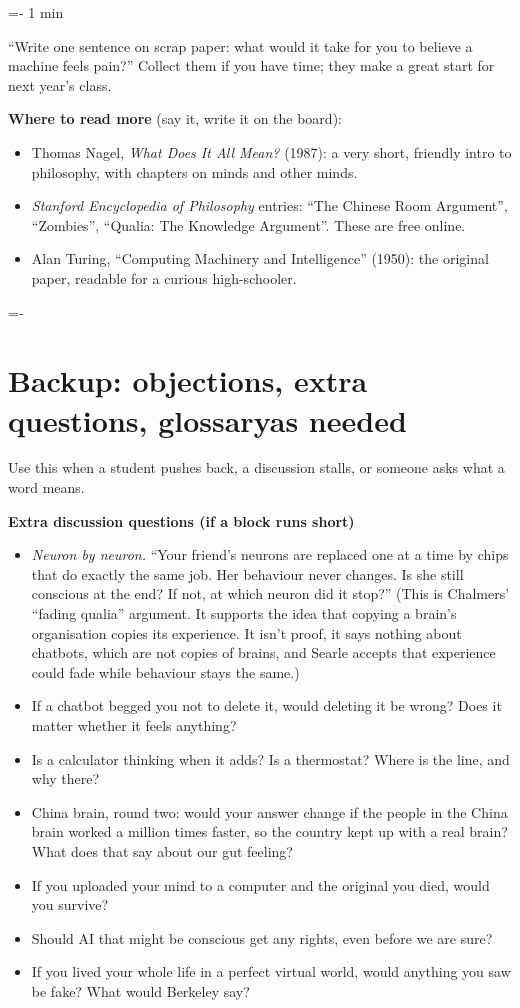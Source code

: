 \documentclass[11pt,letterpaper]{article}
\makeatletter
\newcommand{\keep}[1]{\par\penalty\z@\begingroup\dimen@=#1\relax\dimen@ii=\pagegoal\advance\dimen@ii-\pagetotal
  \ifdim\dimen@>\dimen@ii\ifdim\dimen@ii>\z@\vfil\break\fi\fi\endgroup}
\newcommand{\block}[2]{\keep{6\baselineskip}\section[#1]{#1\hfill{\normalsize\mdseries\color{muted}#2}}}
\newcommand{\beat}[2]{\keep{3\baselineskip}\vspace{5pt}\noindent{\sffamily\bfseries #1}\hfill{\sffamily\small\color{muted}#2}\par\nopagebreak\vspace{1pt}}
\makeatother
\begin{document}
\beat{Exit question}{1 min}
``Write one sentence on scrap paper: what would it take for you to believe a machine feels pain?'' Collect them if you have time; they make a great start for next year's class.

\textsf{\bfseries Where to read more} (say it, write it on the board):
\begin{itemize}
\item Thomas Nagel, \emph{What Does It All Mean?} (1987): a very short, friendly intro to philosophy, with chapters on minds and other minds.
\item \emph{Stanford Encyclopedia of Philosophy} entries: ``The Chinese Room Argument'', ``Zombies'', ``Qualia: The Knowledge Argument''. These are free online.
\item Alan Turing, ``Computing Machinery and Intelligence'' (1950): the original paper, readable for a curious high-schooler.
\end{itemize}

\block{Backup: objections, extra questions, glossary}{as needed}

Use this when a student pushes back, a discussion stalls, or someone asks what a word means.

\textsf{\bfseries Extra discussion questions (if a block runs short)}
\begin{itemize}
\item \emph{Neuron by neuron.} ``Your friend's neurons are replaced one at a time by chips that do exactly the same job. Her behaviour never changes. Is she still conscious at the end? If not, at which neuron did it stop?'' (This is Chalmers' ``fading qualia'' argument. It supports the idea that copying a brain's organisation copies its experience. It isn't proof, it says nothing about chatbots, which are not copies of brains, and Searle accepts that experience could fade while behaviour stays the same.)
\item If a chatbot begged you not to delete it, would deleting it be wrong? Does it matter whether it feels anything?
\item Is a calculator thinking when it adds? Is a thermostat? Where is the line, and why there?
\item China brain, round two: would your answer change if the people in the China brain worked a million times faster, so the country kept up with a real brain? What does that say about our gut feeling?
\item If you uploaded your mind to a computer and the original you died, would you survive?
\item Should AI that might be conscious get any rights, even before we are sure?
\item If you lived your whole life in a perfect virtual world, would anything you saw be fake? What would Berkeley say?
\end{itemize}
\end{document}

